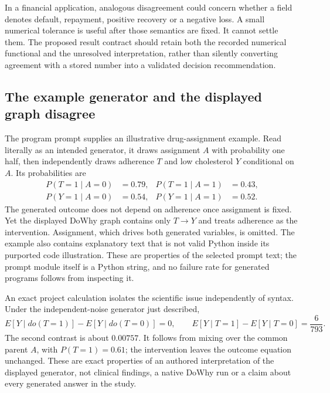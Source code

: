 In a financial application, analogous disagreement could concern whether a
field denotes default, repayment, positive recovery or a negative loss. A small
numerical tolerance is useful after those semantics are fixed. It cannot settle
them. The proposed result contract should retain both the recorded numerical
functional and the unresolved interpretation, rather than silently converting
agreement with a stored number into a validated decision recommendation.

\subsection{The example generator and the displayed graph disagree}
\label{exec21:prophetsrepo-generator}
The program prompt supplies an illustrative drug-assignment example. Read
literally as an intended generator, it draws assignment $A$ with probability
one half, then independently draws adherence $T$ and low cholesterol $Y$
conditional on $A$. Its probabilities are
\[
 \begin{aligned}
 P(T=1\mid A=0)&=0.79,& P(T=1\mid A=1)&=0.43,\\
 P(Y=1\mid A=0)&=0.54,& P(Y=1\mid A=1)&=0.52.
 \end{aligned}
\]
The generated outcome does not depend on adherence once assignment is fixed.
Yet the displayed DoWhy graph contains only $T\to Y$ and treats adherence as
the intervention. Assignment, which drives both generated variables, is omitted.
The example also contains explanatory text that is not valid Python inside
its purported code illustration. These are properties of the selected prompt
text; the prompt module itself is a Python string, and no failure rate for
generated programs follows from inspecting it.~\citep{exec21_prophets_repo}

An exact project calculation isolates the scientific issue independently of
syntax. Under the independent-noise generator just described,
\begin{equation}
 E[Y\mid do(T=1)]-E[Y\mid do(T=0)]=0,
 \qquad
 E[Y\mid T=1]-E[Y\mid T=0]=\frac{6}{793}.
 \label{exec21:prophetsrepo-confounding}
\end{equation}
The second contrast is about $0.00757$. It follows from mixing over the common
parent $A$, with $P(T=1)=0.61$; the intervention leaves the outcome equation
unchanged. These are exact properties of an authored interpretation of the
displayed generator, not clinical findings, a native DoWhy run or a claim about
every generated answer in the study.~\citep{exec21_prophets_repo_reference}

